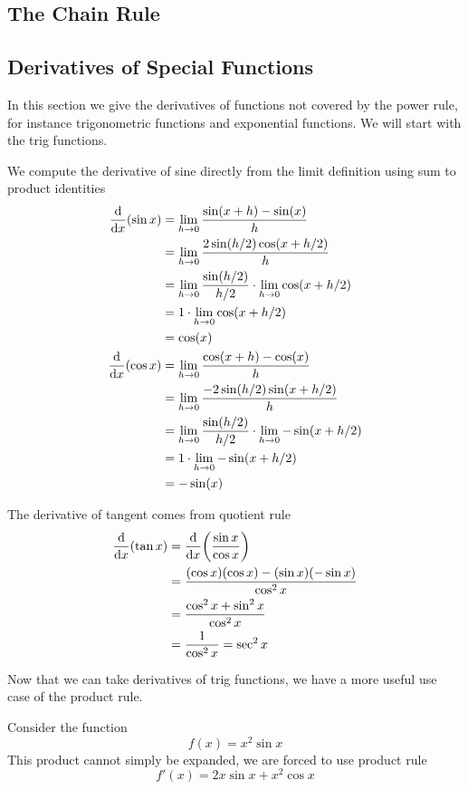 \newpage
\subsection{The Chain Rule}

\newpage 
\subsection{Derivatives of Special Functions}
In this section we give the derivatives of functions not covered by the power rule, for instance trigonometric functions and exponential functions. We will start with the trig functions.

We compute the derivative of sine directly from the limit definition using sum to product identities
\begin{align*}
	\dv{x} (\sin x) &= \lim_{h \to 0} \frac{\sin(x + h) - \sin(x)}{h} \\
	&= \lim_{h \to 0} \frac{2\sin(h/2)\cos(x + h/2)}{h} \\
	&= \lim_{h \to 0} \frac{\sin(h/2)}{h/2} \cdot \lim_{h \to 0} \cos(x + h/2) \\
	&= 1 \cdot \lim_{h \to 0} \cos(x + h/2) \\
	&= \cos(x) \\
	\dv{x} (\cos x) &= \lim_{h \to 0} \frac{\cos(x + h) - \cos(x)}{h} \\
	&= \lim_{h \to 0} \frac{-2\sin(h/2)\sin(x + h/2)}{h} \\
	&= \lim_{h \to 0} \frac{\sin(h/2)}{h/2} \cdot \lim_{h \to 0} -\sin(x + h/2) \\
	&= 1 \cdot \lim_{h \to 0} -\sin(x + h/2) \\
	&= -\sin(x) 
\end{align*}

The derivative of tangent comes from quotient rule
\begin{align*}
	\dv{x} (\tan x) &= \dv{x} \qty(\frac{\sin x}{\cos x}) \\
	&= \frac{(\cos x)(\cos x) - (\sin x)(-\sin x)}{\cos^2 x} \\
	&= \frac{\cos^2 x + \sin^2 x}{\cos^2 x} \\
	&= \frac{1}{\cos^2 x} = \sec^2 x 
\end{align*}

Now that we can take derivatives of trig functions, we have a more useful use case of the product rule.
\begin{example}
	Consider the function
	\[ f(x) = x^2 \sin x \]
	This product cannot simply be expanded, we are forced to use product rule
	\[ f'(x) = 2x \sin x + x^2 \cos x \]
\end{example}

